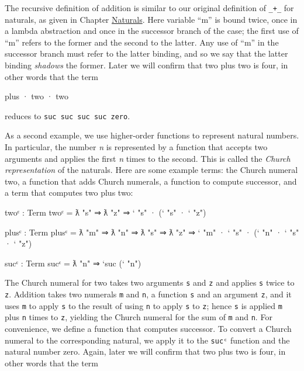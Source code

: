 The recursive definition of addition is similar to our original
definition of \texttt{\_+\_} for naturals, as given in Chapter
\protect\hyperlink{Naturals-plus}{Naturals}. Here variable ``m'' is
bound twice, once in a lambda abstraction and once in the successor
branch of the case; the first use of ``m'' refers to the former and the
second to the latter. Any use of ``m'' in the successor branch must
refer to the latter binding, and so we say that the latter binding
\emph{shadows} the former. Later we will confirm that two plus two is
four, in other words that the term

\begin{myDisplay}
plus · two · two
\end{myDisplay}

reduces to
\texttt{\textasciigrave{}suc\ \textasciigrave{}suc\ \textasciigrave{}suc\ \textasciigrave{}suc\ \textasciigrave{}zero}.

As a second example, we use higher-order functions to represent natural
numbers. In particular, the number \emph{n} is represented by a function
that accepts two arguments and applies the first \emph{n} times to the
second. This is called the \emph{Church representation} of the naturals.
Here are some example terms: the Church numeral two, a function that
adds Church numerals, a function to compute successor, and a term that
computes two plus two:

\begin{fence}
\begin{code}
twoᶜ : Term
twoᶜ =  ƛ "s" ⇒ ƛ "z" ⇒ ` "s" · (` "s" · ` "z")

plusᶜ : Term
plusᶜ =  ƛ "m" ⇒ ƛ "n" ⇒ ƛ "s" ⇒ ƛ "z" ⇒
         ` "m" · ` "s" · (` "n" · ` "s" · ` "z")

sucᶜ : Term
sucᶜ = ƛ "n" ⇒ `suc (` "n")
\end{code}
\end{fence}

The Church numeral for two takes two arguments \texttt{s} and \texttt{z}
and applies \texttt{s} twice to \texttt{z}. Addition takes two numerals
\texttt{m} and \texttt{n}, a function \texttt{s} and an argument
\texttt{z}, and it uses \texttt{m} to apply \texttt{s} to the result of
using \texttt{n} to apply \texttt{s} to \texttt{z}; hence \texttt{s} is
applied \texttt{m} plus \texttt{n} times to \texttt{z}, yielding the
Church numeral for the sum of \texttt{m} and \texttt{n}. For
convenience, we define a function that computes successor. To convert a
Church numeral to the corresponding natural, we apply it to the
\texttt{sucᶜ} function and the natural number zero. Again, later we will
confirm that two plus two is four, in other words that the term

